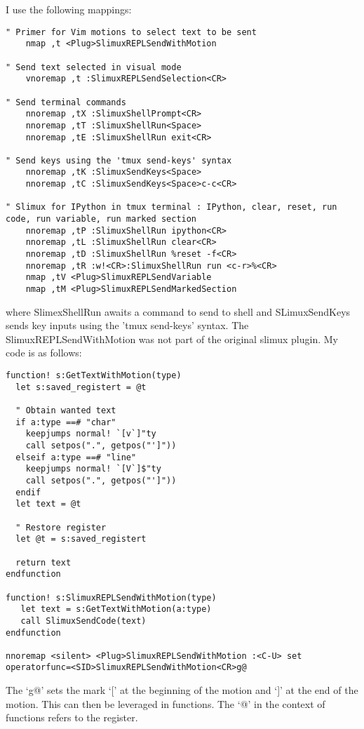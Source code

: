 I use the following mappings:
\begin{lstlisting}
" Primer for Vim motions to select text to be sent
    nmap ,t <Plug>SlimuxREPLSendWithMotion

" Send text selected in visual mode
    vnoremap ,t :SlimuxREPLSendSelection<CR>

" Send terminal commands
    nnoremap ,tX :SlimuxShellPrompt<CR>
    nnoremap ,tT :SlimuxShellRun<Space>
    nnoremap ,tE :SlimuxShellRun exit<CR>

" Send keys using the 'tmux send-keys' syntax
    nnoremap ,tK :SlimuxSendKeys<Space>
    nnoremap ,tC :SlimuxSendKeys<Space>c-c<CR>

" Slimux for IPython in tmux terminal : IPython, clear, reset, run code, run variable, run marked section
    nnoremap ,tP :SlimuxShellRun ipython<CR>
    nnoremap ,tL :SlimuxShellRun clear<CR>
    nnoremap ,tD :SlimuxShellRun %reset -f<CR>
    nnoremap ,tR :w!<CR>:SlimuxShellRun run <c-r>%<CR>
    nmap ,tV <Plug>SlimuxREPLSendVariable
    nmap ,tM <Plug>SlimuxREPLSendMarkedSection
\end{lstlisting}
where SlimexShellRun awaits a command to send to shell and SLimuxSendKeys sends
key inputs using the 'tmux send-keys' syntax. The SlimuxREPLSendWithMotion was
not part of the original slimux plugin. My code is as follows:
\begin{lstlisting}
function! s:GetTextWithMotion(type)
  let s:saved_registert = @t

  " Obtain wanted text
  if a:type ==# "char"
    keepjumps normal! `[v`]"ty
    call setpos(".", getpos("']"))
  elseif a:type ==# "line"
    keepjumps normal! `[V`]$"ty
    call setpos(".", getpos("']"))
  endif
  let text = @t

  " Restore register
  let @t = s:saved_registert

  return text
endfunction

function! s:SlimuxREPLSendWithMotion(type)
   let text = s:GetTextWithMotion(a:type)
   call SlimuxSendCode(text)
endfunction

nnoremap <silent> <Plug>SlimuxREPLSendWithMotion :<C-U> set operatorfunc=<SID>SlimuxREPLSendWithMotion<CR>g@
\end{lstlisting}
The `g@' sets the mark `[' at the beginning of the motion and `]' at the end of
the motion. This can then be leveraged in functions. The `@' in the context of
functions refers to the register.

